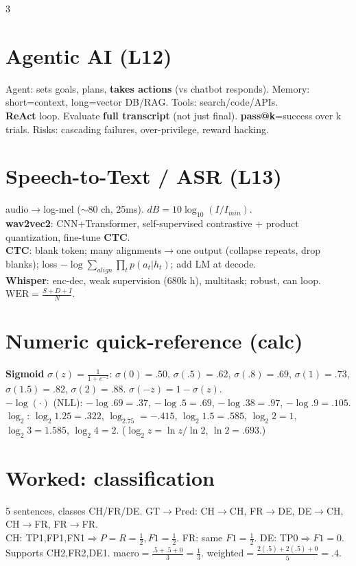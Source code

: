 \documentclass[12pt]{extarticle} %
\newcommand{\sub}[1]{\textcolor{key}{\textbf{#1}}}
\newcommand{\fb}[1]{\colorbox{yellow!30}{$#1$}} %
\begin{document}
\begin{multicols}{3}
\section{Agentic AI \textnormal{(L12)}}
Agent: sets goals, plans, \sub{takes actions} (vs chatbot responds). Memory: short=context, long=vector DB/RAG. Tools: search/code/APIs.\\
\sub{ReAct} loop. Evaluate \sub{full transcript} (not just final). \sub{pass@k}=success over k trials. Risks: cascading failures, over-privilege, reward hacking.

\section{Speech-to-Text / ASR \textnormal{(L13)}}
audio$\to$log-mel ($\sim$80 ch, 25ms). $dB{=}10\log_{10}(I/I_{min})$.\\
\sub{wav2vec2}: CNN+Transformer, self-supervised contrastive + product quantization, fine-tune \sub{CTC}.\\
\sub{CTC}: blank token; many alignments$\to$one output (collapse repeats, drop blanks); loss $-\log\sum_{align}\prod_t p(a_t|h_t)$; add LM at decode.\\
\sub{Whisper}: enc-dec, weak supervision (680k h), multitask; robust, can loop.\\
\fb{\text{WER}=\tfrac{S+D+I}{N}}.

\section{Numeric quick-reference \textnormal{(calc)}}
\sub{Sigmoid} $\sigma(z)=\tfrac1{1+e^{-z}}$: $\sigma(0){=}.50$, $\sigma(.5){=}.62$, $\sigma(.8){=}.69$, $\sigma(1){=}.73$, $\sigma(1.5){=}.82$, $\sigma(2){=}.88$. $\sigma(-z){=}1{-}\sigma(z)$.\\
$-\log(\cdot)$ (NLL): $-\log.69{=}.37$, $-\log.5{=}.69$, $-\log.38{=}.97$, $-\log.9{=}.105$.\\
\sub{$\log_2$}: $\log_2 1.25{=}.322$, $\log_2.75{=}-.415$, $\log_2 1.5{=}.585$, $\log_2 2{=}1$, $\log_2 3{=}1.585$, $\log_2 4{=}2$. ($\log_2 z=\ln z/\ln2$, $\ln2{=}.693$.)

\section{Worked: classification}
5 sentences, classes CH/FR/DE. GT$\to$Pred: CH$\to$CH, FR$\to$DE, DE$\to$CH, CH$\to$FR, FR$\to$FR.\\
CH: TP1,FP1,FN1$\Rightarrow P{=}R{=}\tfrac12,F1{=}\tfrac12$. FR: same $F1{=}\tfrac12$. DE: TP0$\Rightarrow F1{=}0$.\\
Supports CH2,FR2,DE1. macro$=\tfrac{.5+.5+0}{3}=\tfrac13$. weighted$=\tfrac{2(.5)+2(.5)+0}{5}=.4$.


\end{multicols}
\end{document}

